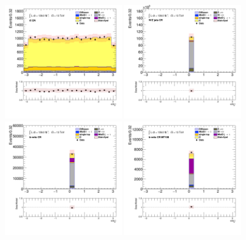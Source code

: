 		\begin{figure}[!htp]
			\begin{center}    
			\includegraphics[width=0.45\textwidth]{chapters/chapter6_HPlus/images/taujets/bjet_0_phi_TTBAR.png}
			\includegraphics[width=0.45\textwidth]{chapters/chapter6_HPlus/images/taujets/bjet_0_phi_WJETS.png} \\
			\includegraphics[width=0.45\textwidth]{chapters/chapter6_HPlus/images/taujets/bjet_0_phi_BVETO.png}
			\includegraphics[width=0.45\textwidth]{chapters/chapter6_HPlus/images/taujets/bjet_0_phi_BVETO_MT100.png} \\

\end{center}
\end{figure}
